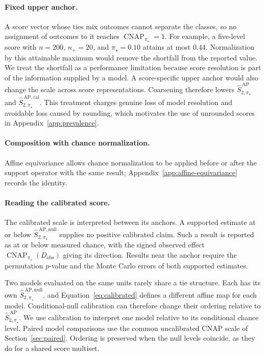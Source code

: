 \documentclass[11pt]{article}
\newcommand{\CNAP}{\operatorname{CNAP}}
\newcommand{\Tpi}{\CNAP_{\pi_\star}}
\newcommand{\SAPHat}{\widehat S_{2,\pi_\star}^{\,\mathrm{AP}}}
\newcommand{\SAPnullHat}{\widehat S_{2,\pi_\star}^{\,\mathrm{AP,null}}}
\newcommand{\SAPcalHat}{\widehat S_{2,\pi_\star}^{\,\mathrm{AP,cal}}}
\theoremstyle{remark}
\begin{document}
\paragraph{Fixed upper anchor.}
A score vector whose ties mix outcomes cannot separate the classes, so no assignment of outcomes to it reaches $\Tpi=1$. For example, a five-level score with $n=200$, $n_+=20$, and $\pi_\star=0.10$ attains at most $0.44$. Normalization by this attainable maximum would remove the shortfall from the reported value. We treat the shortfall as a performance limitation because score resolution is part of the information supplied by a model. A score-specific upper anchor would also change the scale across score representations. Coarsening therefore lowers $\SAPHat$ and $\SAPcalHat$. This treatment charges genuine loss of model resolution and avoidable loss caused by rounding, which motivates the use of unrounded scores in Appendix~\ref{app:prevalence}.

\paragraph{Composition with chance normalization.}
Affine equivariance allows chance normalization to be applied before or after the support operator with the same result; Appendix~\ref{app:affine-equivariance} records the identity.

\paragraph{Reading the calibrated score.}
The calibrated scale is interpreted between its anchors. A supported estimate at or below $\SAPnullHat$ supplies no positive calibrated claim. Such a result is reported as at or below measured chance, with the signed observed effect $\Tpi(D_{\mathrm{obs}})$ giving its direction. Results near the anchor require the permutation $p$-value and the Monte Carlo errors of both supported estimates.

Two models evaluated on the same units rarely share a tie structure. Each has its own $\SAPnullHat$, and Equation~\eqref{eq:calibrated} defines a different affine map for each model. Conditional-null calibration can therefore change their ordering relative to $\SAPHat$. We use calibration to interpret one model relative to its conditional chance level. Paired model comparisons use the common uncalibrated CNAP scale of Section~\ref{sec:paired}. Ordering is preserved when the null levels coincide, as they do for a shared score multiset.
\end{document}
